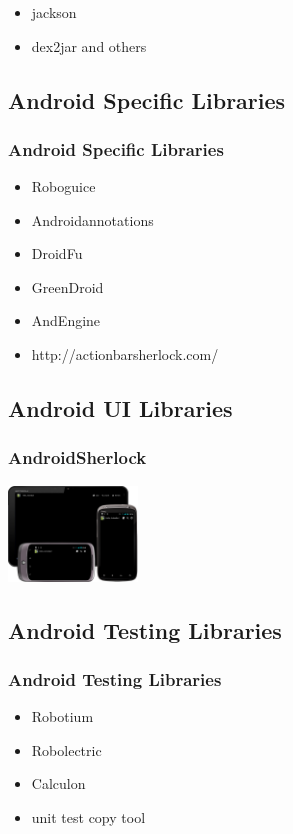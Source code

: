 \documentclass{beamer}
\begin{document}
    \begin{frame}
      \frametitle{}
      \begin{itemize}
        \item<1->jackson
        \item<2->dex2jar and others
      \end{itemize}
    \end{frame}

  \subsection{Android Specific Libraries}

    \begin{frame}
      \frametitle{Android Specific Libraries}
      \begin{itemize}
        \item<1->Roboguice 
        \item<2->Androidannotations
        \item<3->DroidFu
        \item<4->GreenDroid
        \item<5->AndEngine
        \item<6->http://actionbarsherlock.com/
      \end{itemize}
    \end{frame}

  \subsection{Android UI Libraries}

    \begin{frame}
      \frametitle{AndroidSherlock}
      \begin{center}
      \includegraphics[height=1.0in]{androidsherlock.png}
      \end{center}
    \end{frame}

  \subsection{Android Testing Libraries}

    \begin{frame}
      \frametitle{Android Testing Libraries}
      \begin{itemize}
        \item<1->Robotium 
        \item<2->Robolectric
        \item<3->Calculon
        \item<4->unit test copy tool
      \end{itemize}
    \end{frame}
\end{document}
